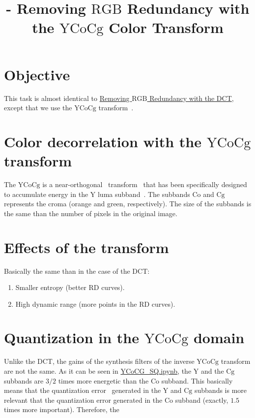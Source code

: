 

\title{\SM{} - Removing $\text{RGB}$ Redundancy with the $\text{YCoCg}$ Color Transform}

\maketitle
\tableofcontents

\section{Objective}
This task is almost identical to
\href{https://sistemas-multimedia.github.io/contents/YCoCg_SQ/}{Removing
  $\text{RGB}$ Redundancy with the DCT}, except that we use the
$\text{YCoCg}$ transform~\cite{vruiz__YCoCg}.

\section{Color decorrelation with the $\text{YCoCg}$ transform}
The $\text{YCoCg}$ is a near-orthogonal~\cite{vruiz__YCoCg}
transform~\cite{vruiz__transform_coding} that has been specifically
designed to accumulate energy in the $\text{Y}$ luma
subband~\cite{vruiz__image_IO}. The subbands $\text{Co}$ and
$\text{Cg}$ represents the croma (orange and green, respectively). The
size of the subbands is the same than the number of pixels in the
original image.

\section{Effects of the transform}
Basically the same than in the case of the DCT:
\begin{enumerate}
\item Smaller entropy (better RD curves).
\item High dynamic range (more points in the RD curves).
\end{enumerate}

\section{Quantization in the $\text{YCoCg}$ domain}
Unlike the DCT, the gains of the synthesis filters of the inverse
$\text{YCoCg}$ transform are not the same. As it can be seen in
\href{https://github.com/Sistemas-Multimedia/Sistemas-Multimedia.github.io/blob/master/contents/YCoCg_SQ/YCoCG_SQ.ipynb}{YCoCG_SQ.ipynb},
the $\text{Y}$ and the $\text{Cg}$ subbands are $3/2$ times more
energetic than the $\text{Co}$ subband. This basically means that the
quantization error~\cite{vruiz__signal_quantization} generated in the
$\text{Y}$ and $\text{Cg}$ subbands is more relevant that the
quantization error generated in the $\text{Co}$ subband (exactly,
$1.5$ times more important). Therefore, the 

